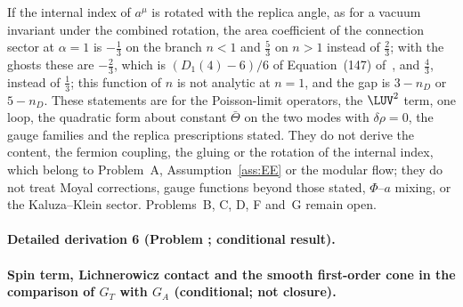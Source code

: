 


If the internal index of \(a^\mu\) is rotated with the replica angle, as for a vacuum invariant under the combined rotation, the area coefficient of the connection sector at \(\alpha=1\) is \(-\tfrac13\) on the branch \(n<1\) and \(\tfrac53\) on \(n>1\) instead of \(\tfrac23\); with the ghosts these are \(-\tfrac23\), which is \((D_1(4)-6)/6\) of Equation~(147) of~\cite{Solodukhin2011}, and \(\tfrac43\), instead of \(\tfrac13\); this function of \(n\) is not analytic at \(n=1\), and the gap is \(3-n_D\) or \(5-n_D\). These statements are for the Poisson-limit operators, the \(\LUV^2\) term, one loop, the quadratic form about constant \(\bar\Theta\) on the two modes with \(\delta\rho=0\), the gauge families and the replica prescriptions stated. They do not derive the content, the fermion coupling, the gluing or the rotation of the internal index, which belong to Problem~A, Assumption~\ref{ass:EE} or the modular flow; they do not treat Moyal corrections, gauge functions beyond those stated, \(\Phi\)--\(a\) mixing, or the Kaluza--Klein sector. Problems~B, C, D, F and~G remain open.



\paragraph{Detailed derivation 6 (Problem ; conditional result).} \label{ref:detail-5} %



\paragraph{Spin term, Lichnerowicz contact and the smooth first-order cone in the comparison of \(G_T\) with \(G_A\) (conditional; not closure).}

